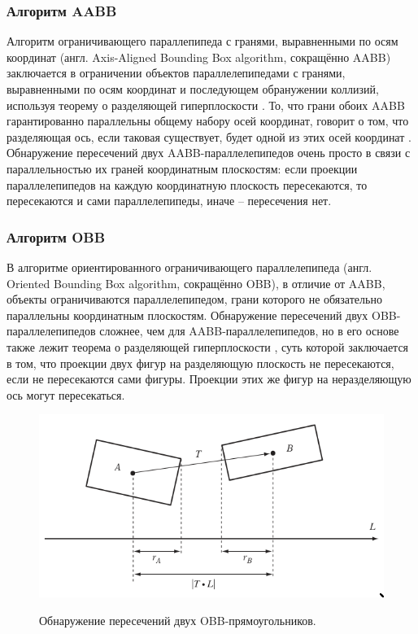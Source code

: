 \subsubsection{Алгоритм AABB}

Алгоритм ограничивающего параллепипеда с гранями, выравненными по осям
координат (англ. Axis-Aligned Bounding Box algorithm, сокращённо AABB)
заключается в ограничении объектов параллелепипедами с гранями, выравненными по
осям координат и последующем обранужении коллизий, используя теорему о
разделяющей гиперплоскости \cite{hpst}. То, что грани обоих AABB гарантированно
параллельны общему набору осей координат, говорит о том, что разделяющая ось,
если таковая существует, будет одной из этих осей координат \cite[с.~827]{gea}.
Обнаружение пересечений двух AABB-параллелепипедов очень просто в связи с
параллельностью их граней координатным плоскостям: если проекции
параллелепипедов на каждую координатную плоскость пересекаются, то пересекаются
и сами параллелепипеды, иначе -- пересечения нет.

\subsubsection{Алгоритм OBB}

В алгоритме ориентированного ограничивающего параллелепипеда (англ. Oriented
Bounding Box algorithm, сокращённо OBB), в отличие от AABB, объекты
ограничиваются параллелепипедом, грани которого не обязательно параллельны
координатным плоскостям. Обнаружение пересечений двух OBB-параллелепипедов
сложнее, чем для AABB-параллелепипедов, но в его основе также лежит теорема о
разделяющей гиперплоскости \cite{hpst}, суть которой заключается в том, что
проекции двух фигур на разделяющую плоскость не пересекаются, если не
пересекаются сами фигуры. Проекции этих же фигур на неразделяющую ось могут
пересекаться.

\begin{figure}[h]
    \caption{Обнаружение пересечений двух OBB-прямоугольников. \cite[102]{rtcd}}
    \noindent\includegraphics[width=\linewidth]{img/OBB-test.jpg}
    \label{fig:obb-test}
\end{figure}

